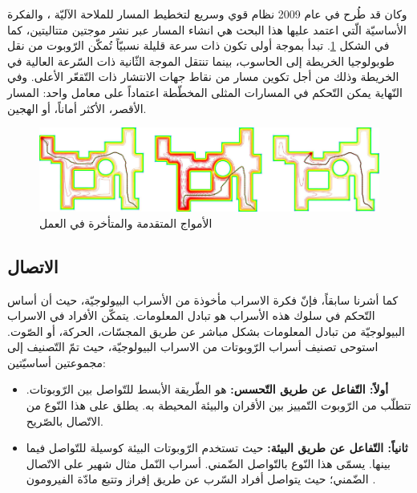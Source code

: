   
      
      وكان قد طُرح في عام 2009 نظام  قوي وسريع لتخطيط المسار للملاحة الآليّة \cite{b14}، والفكرة الأساسيّة الّتي اعتمد عليها هذا البحث هي انشاء المسار عبر نشر موجتين متتاليتين، كما في الشكل \ref{06:fig:3}. تبدأ بموجة أولى تكون ذات سرعة قليلة نسبيّاً تُمكّن الرّوبوت من نقل طوبولوجيا الخريطة إلى الحاسوب، بينما تنتقل الموجة الثّانية ذات السّرعة العالية في الخريطة وذلك من أجل تكوين مسار من نقاط جهات الانتشار ذات التّقعّر الأعلى. وفي النّهاية يمكن التّحكم في المسارات المثلى المخطّطة اعتماداً على معامل واحد: المسار الأقصر، الأكثر أماناً، أو الهجين.
       \begin{figure}[h]
      	\centering
      	\includegraphics[width=0.9\linewidth]{figs/06/fig06_3}
      	\caption{الأمواج المتقدمة والمتأخرة في العمل\cite{b14}}
      	\label{06:fig:3}
      \end{figure}
      
      
      \subsection{الاتصال}
      
      كما أشرنا سابقاً، فإنّ فكرة الاسراب مأخوذة من الأسراب البيولوجيّة، حيث أن أساس التّحكم في سلوك هذه الأسراب هو تبادل المعلومات. يتمكّن الأفراد في الاسراب البيولوجيّة من تبادل المعلومات بشكل مباشر عن طريق المجسّات، الحركة، أو الصّوت. استوحى \cite{b15} تصنيف أسراب الرّوبوتات من الاسراب البيولوجيّة، حيث تمّ التّصنيف إلى مجموعتين أساسيّتين:
            
      \begin{itemize}
      	\item \textbf{أولاً: التّفاعل عن طريق التّحسس:} هو الطّريقة الأبسط للتّواصل بين الرّوبوتات. تتطلّب من الرّوبوت التّمييز بين الأقران والبيئة المحيطة به. يطلق على هذا النّوع من الاتّصال بالصّريح. 
      	\item \textbf{ثانياً: التّفاعل عن طريق البيئة:} حيث تستخدم الرّوبوتات البيئة كوسيلة للتّواصل فيما بينها. يسمّى هذا النّوع بالتّواصل الضّمني. أسراب النّمل مثال شهير على الاتّصال الضّمني؛ حيث يتواصل أفراد السّرب عن طريق إفراز وتتبع مادّة الفيرومون \cite{b15}.
      \end{itemize}
      

